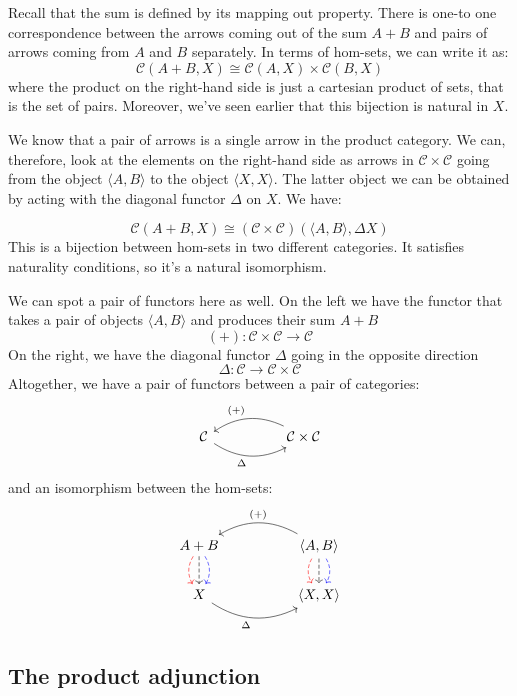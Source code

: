 \documentclass[DaoFP]{subfiles}
\begin{document}
Recall that the sum is defined by its mapping out property. There is one-to one correspondence between the arrows coming out of the sum $A + B$ and pairs of arrows coming from $A$ and $B$ separately. In terms of hom-sets, we can write it as:
\[  \mathcal{C} (A + B, X) \cong \mathcal{C}( A , X) \times \mathcal{C}( B , X)\]
where the product on the right-hand side is just a cartesian product of sets, that is the set of pairs. Moreover, we've seen earlier that this bijection is natural in $X$.

We know that a pair of arrows is a single arrow in the product category. We can, therefore, look at the elements on the right-hand side as arrows in $\mathcal{C} \times \mathcal{C}$ going from the object $\langle A, B \rangle$ to the object $\langle X, X \rangle$. The latter object we can be obtained by acting with the diagonal functor $\Delta$ on $X$. We have:

\[  \mathcal{C} (A + B, X) \cong (\mathcal{C} \times \mathcal{C})( \langle A, B \rangle , \Delta X)\]
This is a bijection between hom-sets in two different categories. It satisfies naturality conditions, so it's a natural isomorphism. 

We can spot a pair of functors here as well. On the left we have the functor that takes a pair of objects $\langle A, B \rangle$ and produces their sum $A + B$
\[ (+) \colon \mathcal{C} \times \mathcal{C} \to \mathcal{C}\]
On the right, we have the diagonal functor $\Delta$ going in the opposite direction
\[ \Delta \colon \mathcal{C} \to  \mathcal{C} \times \mathcal{C} \]
Altogether, we have a pair of functors between a pair of categories:
\[
 \begin{tikzcd}
  \mathcal{C}
   \arrow[rr, bend right, "\Delta"']
  &&
  \mathcal{C} \times \mathcal{C}
 \arrow[ll, bend right, "(+)"']
  \end{tikzcd}
\]
and an isomorphism between the hom-sets:
\[
 \begin{tikzcd}
A + B
\arrow[d, bend right, red, dashed]
\arrow[d, dashed]
\arrow[d, bend left, blue, dashed]
  &&
 \langle A , B \rangle
\arrow[d, bend right, red, dashed]
\arrow[d, dashed]
\arrow[d, bend left, blue, dashed]
 \arrow[ll, bend right, "(+)"']
 \\
 X
   \arrow[rr, bend right, "\Delta"']
 &&
 \langle X, X \rangle
  \end{tikzcd}
\]


\subsection{The product adjunction}
\end{document}
